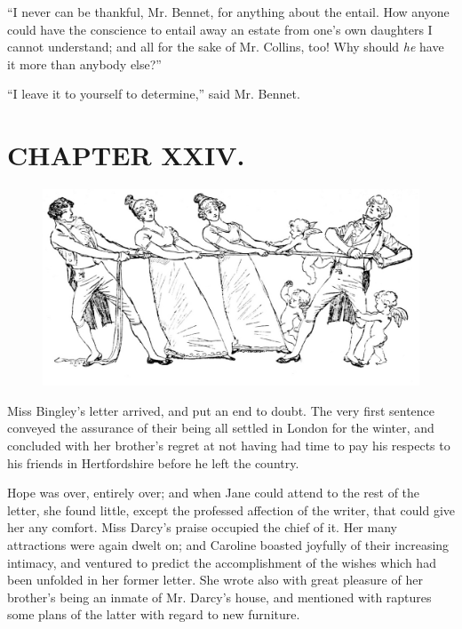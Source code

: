 ``I never can be thankful, Mr. Bennet, for anything about the entail. How anyone could have the conscience to entail away an estate from one's own daughters I cannot understand; and all for the sake of Mr. Collins, too! Why should \textit{he} have it more than anybody else?''

``I leave it to yourself to determine,'' said Mr. Bennet.

\chapter{CHAPTER XXIV.}

\begin{figure}[htbp]
    \centering
    \includegraphics[width=\textwidth]{illustrations/i_197_a.jpg}
\end{figure}


Miss Bingley's letter arrived, and put an end to doubt. The very first sentence conveyed the assurance of their being all settled in London for the winter, and concluded with her brother's regret at not having had time to pay his respects to his friends in Hertfordshire before he left the country.

Hope was over, entirely over; and when Jane could attend to the rest of the letter, she found little, except the professed affection of the writer, that could give her any comfort. Miss Darcy's praise occupied the chief of it. Her many attractions were again dwelt on; and Caroline boasted joyfully of their increasing intimacy, and ventured to predict the accomplishment of the wishes which had been unfolded in her former letter. She wrote also with great pleasure of her brother's being an inmate of Mr. Darcy's house, and mentioned with raptures some plans of the latter with regard to new furniture.

